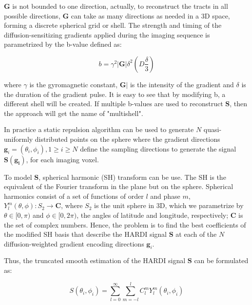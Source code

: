 \documentclass{cys}
\begin{document}
\bigskip
$\mathbf{G}$ is not bounded to one direction, actually, to reconstruct the tracts in all possible directions, $\mathbf{G}$ can take as many directions as needed in a 3D space, forming a discrete spherical grid or shell. The strength and timing of the diffusion-sensitizing gradients applied during the imaging sequence is parametrized by the b-value defined as:

\begin{equation}
b = \gamma^2 |\mathbf{G}|\delta^2\left( D \frac{\delta}{3} \right)
\end{equation}

where $\gamma$ is the gyromagnetic constant, $\mathbf{G}|$ is the intensity of the gradient and $\delta$ is the duration of the gradient pulse. It is easy to see that by modifying b, a different shell will be created. If multiple b-values are used to reconstruct $\mathbf{S}$, then the approach will get the name of "multishell".

\bigskip
In practice a static repulsion algorithm \cite{jones1999optimal} can be used to generate $N$ quasi-uniformly distributed points on the sphere where the gradient directions $\mathbf{g}_i=(\theta_i,\phi_i), 1\ge i \ge N $ define the sampling directions to generate the signal $\mathbf{S}(\mathbf{g_i})$, for each imaging voxel. %


\bigskip
To model $\mathbf{S}$, spherical harmonic (SH) transform can be use. The SH \cite{nikiforov1988special} is the equivalent of the Fourier transform in the plane but on the sphere. Spherical harmonics consist of a set of functions of order $l$ and phase $m$, $Y_l^m (\theta,\phi): S_2 \rightarrow \mathbf{C} $, where $S_2$ is the unit sphere in 3D, which we parametrize by $\theta \in [0,\pi)$ and $\phi \in [0, 2\pi)$, the angles of latitude and longitude, respectively; $\mathbf{C}$ is the set of complex numbers. Hence, the problem is to find the best coefficients of the modified SH basis that describe the HARDI signal $\mathbf{S}$ at each of the $N$ diffusion-weighted gradient encoding directions $\mathbf{g}_i$.

\bigskip
Thus, the truncated smooth estimation of the HARDI signal $\mathbf{S}$ can be formulated as:

\begin{equation}
\label{SignalS}
S(\theta_i,\phi_i)=\sum_{l=0}^\infty \sum_{m=-l}^l C_l^m Y_l^m(\theta_i,\phi_i)
\end{equation}
\end{document}
